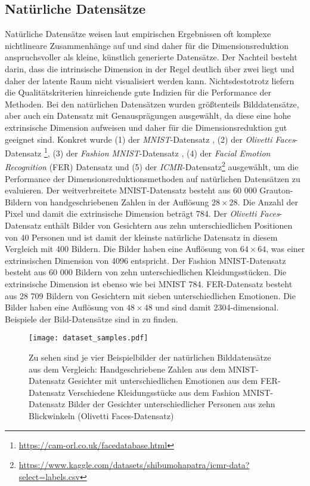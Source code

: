 \subsection{Natürliche Datensätze}
\label{ch:Vergleich:sec:VerwendeteDatensaetze:natuerlich}
Natürliche
Datensätze weisen laut empirischen Ergebnissen \addref oft komplexe nichtlineare Zusammenhänge
auf und sind daher für die Dimensionsreduktion anspruchsvoller als kleine, künstlich generierte
Datensätze. Der Nachteil besteht darin, dass die intrinsische Dimension in der Regel deutlich über
zwei liegt und daher der latente Raum nicht visualisiert werden kann. Nichtsdestotrotz liefern die
Qualitätskriterien hinreichende gute Indizien für die Performance der Methoden. Bei den natürlichen
Datensätzen wurden größtenteils Bilddatensätze, aber auch ein Datensatz mit Genausprägungen ausgewählt, da diese eine
hohe extrinsische Dimension aufweisen und daher für die Dimensionsreduktion gut geeignet sind.
Konkret wurde (1) der \textit{MNIST}-Datensatz \parencite{LeCun.2010}, (2) der \textit{Olivetti Faces}-Datensatz
\footnote{\url{https://cam-orl.co.uk/facedatabase.html}}, (3) der \textit{Fashion MNIST}-Datensatz \parencite{Xiao.8252017}, (4) der \textit{Facial Emotion Recognition} (FER) Datensatz \parencite{DumitruIanGoodfellowWillCukierskiYoshuaBengio.2013} und (5) der
\textit{ICMR}-Datensatz\footnote{\url{https://www.kaggle.com/datasets/shibumohapatra/icmr-data?select=labels.csv}}
ausgewählt, um die Performance der Dimensionsreduktionsmethoden auf natürlichen Datensätzen zu
evaluieren. Der weitverbreitete MNIST-Datensatz besteht aus 60 000 Grauton-Bildern von
handgeschriebenen Zahlen in der Auflösung $28 \times 28$. Die Anzahl der Pixel und damit die
extrinsische Dimension beträgt 784. Der \textit{Olivetti Faces}-Datensatz enthält Bilder von
Gesichtern aus zehn unterschiedlichen Positionen von 40 Personen und ist damit der kleinste
natürliche Datensatz in diesem Vergleich mit 400 Bildern. Die Bilder haben eine Auflösung von $64
	\times 64$, was einer extrinsischen Dimension von 4096 entspricht. Der Fashion MNIST-Datensatz
besteht aus 60 000 Bildern von zehn unterschiedlichen Kleidungsstücken. Die extrinsische Dimension
ist ebenso wie bei MNIST 784. FER-Datensatz besteht aus 28 709 Bildern von Gesichtern mit sieben
unterschiedlichen Emotionen. Die Bilder haben eine Auflösung von $48 \times 48$ und sind damit
2304-dimensional. Beispiele der Bild-Datensätze sind in  zu finden.
\begin{figure}
	\begin{center}
		\texttt{[image: dataset\_samples.pdf]}
	\end{center}
	\caption[Beispielbilder der natürlichen Datensätze]{Zu sehen sind je vier Beispielbilder der natürlichen Bilddatensätze aus dem Vergleich: \captiona Handgeschriebene Zahlen aus dem MNIST-Datensatz \captionb Gesichter mit unterschiedlichen Emotionen aus dem FER-Datensatz \captionc Verschiedene Kleidungsstücke aus dem Fashion MNIST-Datensatz \captiond Bilder der Gesichter unterschiedlicher Personen aus zehn Blickwinkeln (Olivetti Faces-Datensatz)}
	\label{fig:Dataset_samples}
\end{figure}

